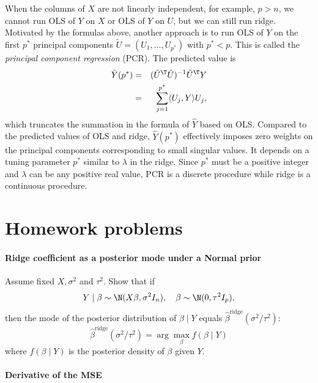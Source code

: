 When the columns of $X$ are not linearly independent, for example, $p>n$, we cannot run OLS of $Y$ on $X$ or OLS of $Y$ on $U$, but we can still run ridge. Motivated by the formulas above, another approach is to run OLS of $Y$ on the first $p^*$ principal components $ \tilde{U} = ( U_1, \ldots, U_{p^*})$ with $p^* < p$. This is called the {\it principal component regression} (PCR). The predicted value is
\begin{eqnarray*}
\hat{Y} (p^*) &=& (\tilde{U}^{\T} \tilde{U}  )^{-1} \tilde{U} ^{\T} Y \\
&=& \sum_{j=1}^{p^*}    \langle U_j , Y\rangle     U_j ,
\end{eqnarray*}
which truncates the summation in the formula of $\hat{Y} $ based on OLS. 
Compared to the predicted values of OLS and ridge, $\hat{Y} (p^*) $ effectively imposes zero weights on the principal components corresponding to small singular values. It depends on a tuning parameter $p^*$ similar to $\lambda$ in the ridge. Since $p^*$ must be a positive integer and $\lambda$ can be any positive real value, PCR is a discrete procedure while ridge is a continuous procedure.  
 
 


\section{Homework problems}

\paragraph{Ridge coefficient as a posterior mode under a Normal prior}\label{hw13::ridge-bayes}

Assume fixed $X, \sigma^2$ and $\tau^2$. 
Show that if
\[
Y \mid \beta \sim\N(X\beta,\sigma^{2} I_n ),\quad\beta\sim\N(0,\tau^{2}I_{p}),
\]
then the mode of the posterior distribution of $\beta\mid Y$ equals $\hat{\beta}^{\text{ridge}}(\sigma^{2}/\tau^{2})$:
$$
\hat{\beta}^{\text{ridge}}(\sigma^{2}/\tau^{2}) = \arg \max_{\beta} f(  \beta\mid Y  )
$$
where $f(\beta\mid Y)$ is the posterior density of $\beta$ given $Y$. 







\paragraph{Derivative of the MSE}\label{hw13::derivative-of-mse}

